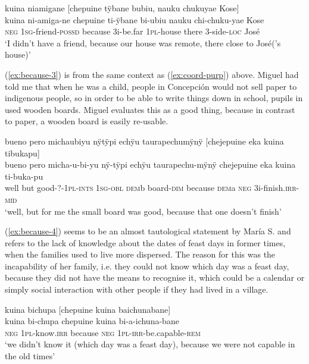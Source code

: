 \ea\label{ex:because-2}
\begingl
\glpreamble kuina niamigane \textup{[}chepuine tÿbane bubiu, nauku chukuyae Kose\textup{]}\\
\gla kuina ni-amiga-ne chepuine ti-ÿbane bi-ubiu nauku chi-chuku-yae Kose\\
\glb \textsc{neg} 1\textsc{sg}-friend-\textsc{possd} because 3i-be.far 1\textsc{pl}-house there 3-side-\textsc{loc} José\\
\glft ‘I didn’t have a friend, because our house was remote, there close to José(’s house)’
\endgl
\trailingcitation{[rxx-p181101l-2.115]}
\xe

(\ref{ex:because-3}) is from the same context as (\ref{ex:coord-purp}) above. Miguel had told me that when he was a child, people in Concepción would not sell paper to indigenous people, so in order to be able to write things down in school, pupils in  used wooden boards. Miguel evaluates this as a good thing, because in contrast to paper, a wooden board is easily re-usable.

\ea\label{ex:because-3}
\begingl
\glpreamble bueno pero michaubiyu nÿtÿpi echÿu taurapechumÿnÿ \textup{[}chejepuine eka kuina tibukapu\textup{]}\\
\gla bueno pero micha-u-bi-yu nÿ-tÿpi echÿu taurapechu-mÿnÿ chejepuine eka kuina ti-buka-pu\\
\glb well but good-?-1\textsc{pl}-\textsc{ints} 1\textsc{sg}-\textsc{obl} \textsc{dem}b board-\textsc{dim} because \textsc{dem}a \textsc{neg} 3i-finish.\textsc{irr}-\textsc{mid}\\
\glft ‘well, but for me the small board was good, because that one doesn’t finish’
\endgl
\trailingcitation{[mxx-p181027l-1.032-033]}
\xe

(\ref{ex:because-4}) seems to be an almost tautological statement by María S. and refers to the lack of knowledge about the dates of feast days in former times, when the families used to live more dispersed. The reason for this was the incapability of her family, i.e. they could not know which day was a feast day, because they did not have the means to recognise it, which could be a calendar or simply social interaction with other people if they had lived in a village.

\ea\label{ex:because-4}
\begingl
\glpreamble kuina bichupa \textup{[}chepuine kuina baichunabane\textup{]}\\
\gla kuina bi-chupa chepuine kuina bi-a-ichuna-bane\\
\glb \textsc{neg} 1\textsc{pl}-know.\textsc{irr} because \textsc{neg} 1\textsc{pl}-\textsc{irr}-be.capable-\textsc{rem}\\
\glft ‘we didn’t know it (which day was a feast day), because we were not capable in the old times’
\endgl
\trailingcitation{[rxx-p181101l-2.016]}
\xe

